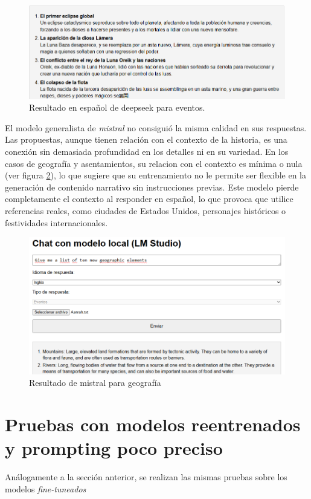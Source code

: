 \begin{figure}[htbp]
	\centering
	\includegraphics[width=1\textwidth]{./Figures/deepseek-noprompt-spanish.png}
	\caption{Resultado en español de deepseek para eventos.}
	\label{fig:deepseek-esp}
\end{figure}
\pagebreak
El modelo generalista de \textit{mistral} no consiguió la misma calidad en sus respuestas.
Las propuestas, aunque tienen relación con el contexto de la historia,
es una conexión sin demasiada profundidad en los detalles ni en su variedad.
En los casos de geografía y asentamientos, su relacion con el contexto es mínima o nula
(ver figura \ref{fig:mistral-geo}), lo que sugiere que su entrenamiento no le permite ser
flexible en la generación de contenido narrativo sin instrucciones previas.
Este modelo pierde completamente el contexto al responder en español,
lo que provoca que utilice referencias reales,
como ciudades de Estados Unidos, personajes históricos o festividades internacionales.

\begin{figure}[htbp]
	\centering
	\includegraphics[width=1\textwidth]{./Figures/mistral-noprompt-geography.png}
	\caption{Resultado de mistral para geografía}
	\label{fig:mistral-geo}
\end{figure}

\section{Pruebas con modelos reentrenados y prompting poco preciso}
Análogamente a la sección anterior, se realizan las mismas pruebas sobre los modelos
\textit{fine-tuneados}

